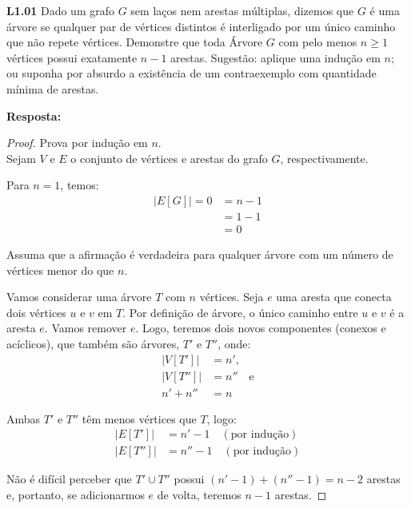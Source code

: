 
\noindent \textbf{L1.01} Dado um grafo $G$ sem laços nem arestas múltiplas, dizemos que $G$ é uma árvore se qualquer par de vértices distintos é interligado por um único caminho que não repete vértices. Demonstre que toda Árvore $G$ com pelo menos $n \geq 1$ vértices possui exatamente $n - 1$ arestas. Sugestão: aplique uma indução em $n$; ou suponha por absurdo a existência de um contraexemplo com quantidade mínima de arestas.

\textbf{Resposta:}
\begin{proof}
Prova por indução em $n$.\\

Sejam $V$ e $E$ o conjunto de vértices e arestas do grafo $G$, respectivamente.

\indbase Para $n = 1$, temos:
\begin{align*}
|E[G]| = 0 &= n - 1 \\
      &= 1 - 1 \\
      &= 0
\end{align*}

\indhipo Assuma que a afirmação é verdadeira para qualquer árvore com um número de vértices menor do que $n$.

\indstep Vamos considerar uma árvore $T$ com $n$ vértices. Seja $e$ uma aresta que conecta dois vértices $u$ e $v$ em $T$. Por definição de árvore, o único caminho entre $u$ e $v$ é a aresta $e$. Vamos remover $e$. Logo, teremos dois novos componentes (conexos e acíclicos), que também são árvores, $T'$ e $T''$, onde:
\begin{align*}
|V[T']|  &= n'  \text{,}\\
|V[T'']| &= n'' \quad \text{e} \\
n' + n'' &= n
\end{align*}

Ambas $T'$ e $T''$ têm menos vértices que $T$, logo:
\begin{align*}
|E[T']|  &= n' - 1   \quad (\text{por indução}) \\
|E[T'']| &= n'' - 1 \quad (\text{por indução})
\end{align*}

Não é difícil perceber que $T' \cup T''$ possui $(n' - 1) + (n'' - 1) = n -2$ arestas e, portanto, se adicionarmos $e$ de volta, teremos $n - 1$ arestas.

\end{proof}